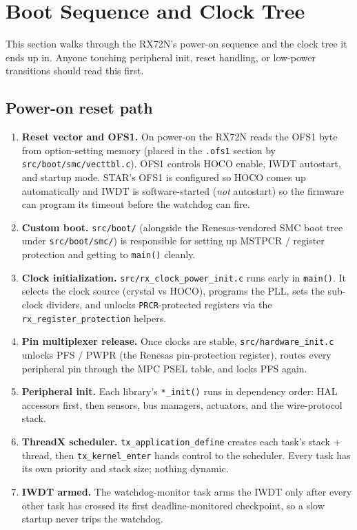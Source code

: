 
\section{Boot Sequence and Clock Tree}
\label{section:boot-clock}

This section walks through the RX72N's power-on sequence and the
clock tree it ends up in. Anyone touching peripheral init, reset
handling, or low-power transitions should read this first.

\subsection{Power-on reset path}

\begin{enumerate}
  \item \textbf{Reset vector and OFS1.} On power-on the RX72N reads the
        OFS1 byte from option-setting memory (placed in the
        \texttt{.ofs1} section by \texttt{src/boot/smc/vecttbl.c}).
        OFS1 controls HOCO enable, IWDT autostart, and startup mode.
        STAR's OFS1 is configured so HOCO comes up automatically and
        IWDT is software-started (\emph{not} autostart) so the
        firmware can program its timeout before the watchdog can fire.
  \item \textbf{Custom boot.} \texttt{src/boot/} (alongside the
        Renesas-vendored SMC boot tree under \texttt{src/boot/smc/}) is
        responsible for setting up MSTPCR / register protection and
        getting to \texttt{main()} cleanly.
  \item \textbf{Clock initialization.}
        \texttt{src/rx\_clock\_power\_init.c} runs early in
        \texttt{main()}. It selects the clock source (crystal vs HOCO),
        programs the PLL, sets the sub-clock dividers, and unlocks
        \texttt{PRCR}-protected registers via the
        \texttt{rx\_register\_protection} helpers.
  \item \textbf{Pin multiplexer release.} Once clocks are stable,
        \texttt{src/hardware\_init.c} unlocks PFS / PWPR (the
        Renesas pin-protection register), routes every peripheral pin
        through the MPC PSEL table, and locks PFS again.
  \item \textbf{Peripheral init.} Each library's \texttt{*\_init()}
        runs in dependency order: HAL accessors first, then sensors,
        bus managers, actuators, and the wire-protocol stack.
  \item \textbf{ThreadX scheduler.}
        \texttt{tx\_application\_define} creates each task's stack +
        thread, then \texttt{tx\_kernel\_enter} hands control to the
        scheduler. Every task has its own priority and stack size;
        nothing dynamic.
  \item \textbf{IWDT armed.} The watchdog-monitor task arms the IWDT
        only after every other task has crossed its first
        deadline-monitored checkpoint, so a slow startup never trips
        the watchdog.
\end{enumerate}

